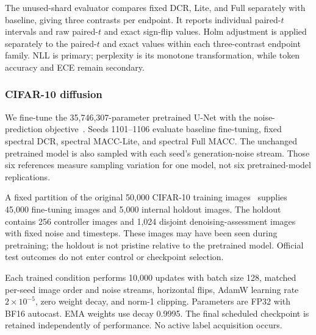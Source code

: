 \documentclass[10pt,a4paper,twocolumn]{article}
\begin{document}
The unused-shard evaluator compares fixed DCR, Lite, and Full separately
with baseline, giving three contrasts per endpoint. It reports individual
paired-$t$ intervals and raw paired-$t$ and exact sign-flip values.
Holm adjustment is applied separately to the paired-$t$ and exact
values within each three-contrast endpoint family. NLL is primary; perplexity is its
monotone transformation, while token accuracy and ECE remain secondary.


\subsubsection{CIFAR-10 diffusion}
\label{sec:diffusion_setup}

We fine-tune the 35,746,307-parameter pretrained
 U-Net with the noise-prediction
objective~\cite{ho2020denoising}.
Seeds 1101--1106 evaluate baseline fine-tuning, fixed spectral
DCR, spectral MACC-Lite, and spectral Full MACC.
The unchanged pretrained model is also sampled with each seed's
generation-noise stream. Those six references measure sampling
variation for one model, not six pretrained-model replications.

A fixed partition of the original 50,000 CIFAR-10 training
images~\cite{krizhevsky2009cifar}
supplies 45,000 fine-tuning images and 5,000 internal holdout
images. The holdout contains 256 controller images and
1,024 disjoint denoising-assessment images with fixed noise
and timesteps. These images may have been seen during
pretraining; the holdout is not pristine relative to the
pretrained model. Official test outcomes do not enter control
or checkpoint selection.

Each trained condition performs 10,000 updates with batch size
128, matched per-seed image order and noise streams,
horizontal flips, AdamW learning rate $2\times10^{-5}$,
zero weight decay, and norm-1 clipping.
Parameters are FP32 with BF16 autocast.
EMA weights use decay 0.9995.
The final scheduled checkpoint is retained independently of
performance. No active label acquisition occurs.
\end{document}
